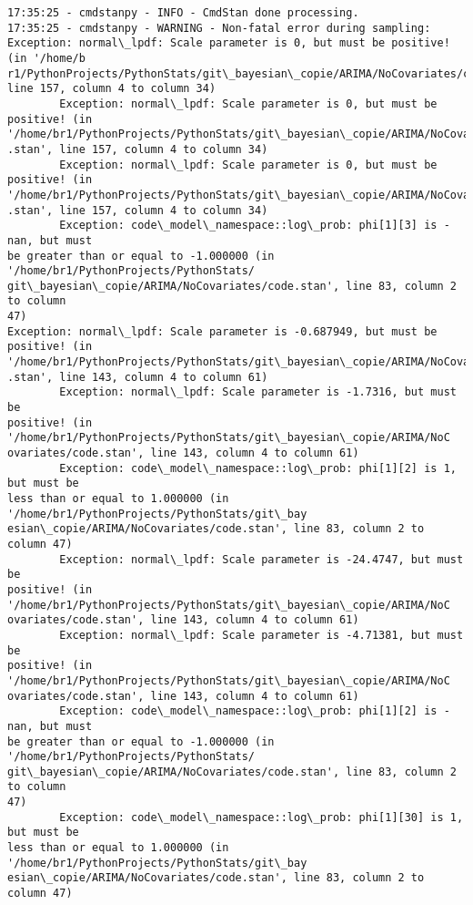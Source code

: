 \documentclass[11pt]{article}
\begin{document}
    \begin{Verbatim}[commandchars=\\\{\}]
17:35:25 - cmdstanpy - INFO - CmdStan done processing.
17:35:25 - cmdstanpy - WARNING - Non-fatal error during sampling:
Exception: normal\_lpdf: Scale parameter is 0, but must be positive! (in '/home/b
r1/PythonProjects/PythonStats/git\_bayesian\_copie/ARIMA/NoCovariates/code.stan',
line 157, column 4 to column 34)
        Exception: normal\_lpdf: Scale parameter is 0, but must be positive! (in 
'/home/br1/PythonProjects/PythonStats/git\_bayesian\_copie/ARIMA/NoCovariates/code
.stan', line 157, column 4 to column 34)
        Exception: normal\_lpdf: Scale parameter is 0, but must be positive! (in 
'/home/br1/PythonProjects/PythonStats/git\_bayesian\_copie/ARIMA/NoCovariates/code
.stan', line 157, column 4 to column 34)
        Exception: code\_model\_namespace::log\_prob: phi[1][3] is -nan, but must
be greater than or equal to -1.000000 (in '/home/br1/PythonProjects/PythonStats/
git\_bayesian\_copie/ARIMA/NoCovariates/code.stan', line 83, column 2 to column
47)
Exception: normal\_lpdf: Scale parameter is -0.687949, but must be positive! (in 
'/home/br1/PythonProjects/PythonStats/git\_bayesian\_copie/ARIMA/NoCovariates/code
.stan', line 143, column 4 to column 61)
        Exception: normal\_lpdf: Scale parameter is -1.7316, but must be
positive! (in '/home/br1/PythonProjects/PythonStats/git\_bayesian\_copie/ARIMA/NoC
ovariates/code.stan', line 143, column 4 to column 61)
        Exception: code\_model\_namespace::log\_prob: phi[1][2] is 1, but must be
less than or equal to 1.000000 (in '/home/br1/PythonProjects/PythonStats/git\_bay
esian\_copie/ARIMA/NoCovariates/code.stan', line 83, column 2 to column 47)
        Exception: normal\_lpdf: Scale parameter is -24.4747, but must be
positive! (in '/home/br1/PythonProjects/PythonStats/git\_bayesian\_copie/ARIMA/NoC
ovariates/code.stan', line 143, column 4 to column 61)
        Exception: normal\_lpdf: Scale parameter is -4.71381, but must be
positive! (in '/home/br1/PythonProjects/PythonStats/git\_bayesian\_copie/ARIMA/NoC
ovariates/code.stan', line 143, column 4 to column 61)
        Exception: code\_model\_namespace::log\_prob: phi[1][2] is -nan, but must
be greater than or equal to -1.000000 (in '/home/br1/PythonProjects/PythonStats/
git\_bayesian\_copie/ARIMA/NoCovariates/code.stan', line 83, column 2 to column
47)
        Exception: code\_model\_namespace::log\_prob: phi[1][30] is 1, but must be
less than or equal to 1.000000 (in '/home/br1/PythonProjects/PythonStats/git\_bay
esian\_copie/ARIMA/NoCovariates/code.stan', line 83, column 2 to column 47)

\end{Verbatim}
\end{document}
